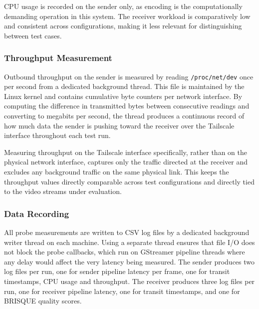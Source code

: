 CPU usage is recorded on the sender only, as encoding is the computationally demanding operation in this system. The receiver workload is comparatively low and consistent across configurations, making it less relevant for distinguishing between test cases.

\subsubsection{Throughput Measurement}

Outbound throughput on the sender is measured by reading \texttt{/proc/net/dev} once per second from a dedicated background thread. This file is maintained by the Linux kernel and contains cumulative byte counters per network interface. By computing the difference in transmitted bytes between consecutive readings and converting to megabits per second, the thread produces a continuous record of how much data the sender is pushing toward the receiver over the Tailscale interface throughout each test run.

Measuring throughput on the Tailscale interface specifically, rather than on the physical network interface, captures only the traffic directed at the receiver and excludes any background traffic on the same physical link. This keeps the throughput values directly comparable across test configurations and directly tied to the video streams under evaluation.

\subsubsection{Data Recording}

All probe measurements are written to CSV log files by a dedicated background writer thread on each machine. Using a separate thread ensures that file I/O does not block the probe callbacks, which run on GStreamer pipeline threads where any delay would affect the very latency being measured. The sender produces two log files per run, one for sender pipeline latency per frame, one for transit timestamps, CPU usage and throughput. The receiver produces three log files per run, one for receiver pipeline latency, one for transit timestamps, and one for BRISQUE quality scores.